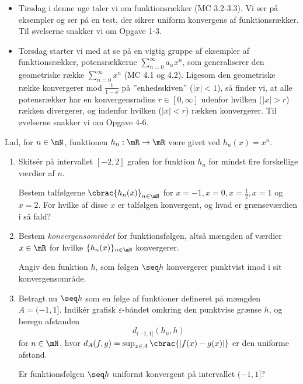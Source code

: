 \begin{itemize}
    \item Tirsdag i denne uge taler vi om funktionsrækker (MC 3.2-3.3). Vi ser på eksempler og ser på en test, der sikrer uniform konvergens af funktionsrækker. Til øvelserne snakker vi om Opgave 1-3.

	\item Torsdag starter vi med at se på en vigtig gruppe af eksempler af funktionsrækker, potensrækkerne $\sum_{n=0}^\infty a_n x^n$, som generaliserer den geometriske række $\sum_{n=0}^\infty x^n$ (MC 4.1 og 4.2). Ligesom den geometriske række konvergerer mod $\frac{1}{1-x}$ på ''enhedsskiven'' ($|x|<1$), så finder vi, at alle potensrækker har en konvergensradius $r \in [0,\infty]$ udenfor hvilken ($|x|>r$) rækken divergerer, og indenfor hvilken ($|x|<r$) rækken konvergerer. Til øvelserne snakker vi om Opgave 4-6.
\end{itemize}

\begin{opg}[Funktionsfølger]
Lad, for $n \in \mN$, funktionen $h_n : \mR \to \mR$ være givet ved $h_n(x) = x^n$.
\begin{enumerate}
	\item Skitsér på intervallet $[-2,2]$ grafen for funktion $h_n$ for mindst fire forskellige værdier af $n$.
	
	Bestem talfølgerne $\cbrac{h_n(x)}_{n \in \mN}$ for $x=-1, x= 0, x= \frac{1}{2}, x= 1$ og $x=2$. For hvilke af disse $x$ er talfølgen konvergent, og hvad er grænseværdien i så fald?
	

	\item Bestem \textit{konvergensområdet} for funktionsfølgen, altså mængden af værdier $x \in \mR$ for hvilke $\{ h_n(x)\}_{n\in\mN}$ konvergerer. 
	
    Angiv den funktion $h$, som følgen $\seq h$ konvergerer punktvist imod i sit konvergensområde.  
    
    \item Betragt nu $\seq h$ som en følge af funktioner defineret på mængden $A= (-1,1]$. Indikér grafisk $\varepsilon$-båndet omkring den punktvise grænse $h$, og beregn afstanden
	$$ d_{(-1,1]}(h_n,  h) $$
    for $n \in \mN$, hvor $d_A(f,g) = \sup_{x \in A} \cbrac{|f(x)-g(x)|}$ er den uniforme afstand.

    Er funktionsfølgen $\seq h$ uniformt konvergent på intervallet $(-1, 1]$?
\end{enumerate}
\end{opg}

